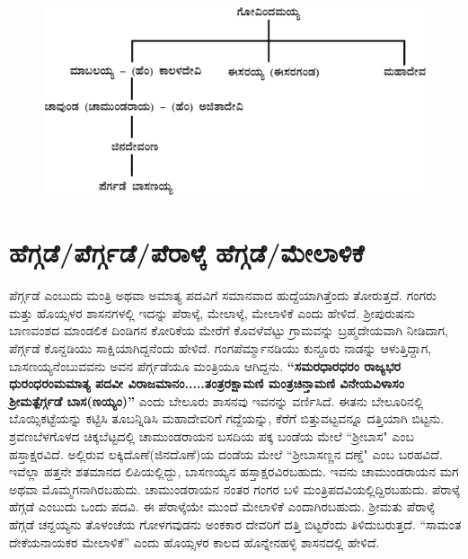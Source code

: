 \begin{figure}[H]
\includegraphics[scale=1.15]{images/chap3/chap3fig1.jpeg}
\end{figure}


\section*{ಹೆಗ್ಗಡೆ/ಪೆರ್ಗ್ಗಡೆ/ಪೆರಾಳ್ಕೆ ಹೆಗ್ಗಡೆ/ಮೇಲಾಳಿಕೆ}

ಪೆರ್ಗ್ಗಡೆ ಎಂಬುದು ಮಂತ್ರಿ ಅಥವಾ ಅಮಾತ್ಯ ಪದವಿಗೆ ಸಮಾನವಾದ ಹುದ್ದೆಯಾಗಿತ್ತೆಂದು ತೋರುತ್ತದೆ. ಗಂಗರು ಮತ್ತು ಹೊಯ್ಸಳರ ಶಾಸನಗಳಲ್ಲಿ ಇದನ್ನು ಪೆರಾಳ್ಕೆ, ಮೇಲಾಳ್ಕೆ, ಮೇಲಾಳಿಕೆ ಎಂದು ಹೇಳಿದೆ. ಶ‍್ರೀಪುರುಷನು ಬಾಣವಂಶದ ಮಾಂಡಲಿಕ ದಿಂಡಿಗನ ಕೋರಿಕೆಯ ಮೇರೆಗೆ ಕೊವಳೆವೆಟ್ಟು ಗ್ರಾಮವನ್ನು ಬ್ರಹ್ಮದೇಯವಾಗಿ ನೀಡಿದಾಗ, ಪೆರ್ಗ್ಗಡೆ ಕೊನ್ದಡಿಯು ಸಾಕ್ಷಿಯಾಗಿದ್ದನೆಂದು ಹೇಳಿದೆ. ಗಂಗಪೆರ್ಮ್ಮಾನಡಿಯು ಕುನ್ದೂರು ನಾಡನ್ನು ಆಳುತ್ತಿದ್ದಾಗ, ಬಾಸಣಯ್ಯನೆಂಬುವವನು ಅವನ ಪೆರ್ಗ್ಗಡೆಯೂ ಮಂತ್ರಿಯೂ ಆಗಿದ್ದನು.\textbf{ “ಸಮರಧಾರಧರಂ ರಾಜ್ಯಭರ ಧುರಂಧರಂಮಮಾತ್ಯ ಪದವೀ ವಿರಾಜಮಾನಂ.....ತಂತ್ರರಕ್ಷಾಮಣಿ ಮಂತ್ರಚಿನ್ತಾಮಣಿ ವಿನೇಯವಿಳಾಸಂ ಶ‍್ರೀಮತ್ಪೆರ್ಗ್ಗಡೆ ಬಾಸ(ಣಯ್ಯಂ)” }ಎಂದು ಬೇಲೂರು ಶಾಸನವು ಇವನನ್ನು ವರ್ಣಿಸಿದೆ. ಈತನು ಬೇಲೂರಿನಲ್ಲಿ ಬೊಯ್ಸಿಕಟ್ಟೆಯನ್ನು ಕಟ್ಟಿಸಿ ತೂಬನ್ನಿಡಿಸಿ ಮಹಾದೇವರಿಗೆ ಗದ್ದೆಯನ್ನು, ಕೆರೆಗೆ ಬಿತ್ತುವಟ್ಟವನ್ನೂ ದತ್ತಿಯಾಗಿ ಬಿಟ್ಟನು. ಶ್ರವಣಬೆಳಗೊಳದ ಚಿಕ್ಕಬೆಟ್ಟದಲ್ಲಿ ಚಾಮುಂಡರಾಯನ ಬಸದಿಯ ಪಕ್ಕ ಬಂಡೆಯ ಮೇಲೆ “ಶ‍್ರೀಬಾಸ" ಎಂಬ ಹಸ್ತಾಕ್ಷರವಿದೆ. ಅಲ್ಲಿರುವ ಲಕ್ಕಿದೊಣೆ(ಜಿನದೊಣೆ)ಯ ದಂಡೆಯ ಮೇಲೆ “ಶ‍್ರೀಬಾಸಣ್ಣನ ದಣ್ಡೆ" ಎಂಬ ಬರಹವಿದೆ. ಇವೆಲ್ಲಾ ಹತ್ತನೇ ಶತಮಾನದ ಲಿಪಿಯಲ್ಲಿದ್ದು, ಬಾಸಣಯ್ಯನ ಹಸ್ತಾಕ್ಷರವಿರಬಹುದು. ಇವನು ಚಾಮುಂಡರಾಯನ ಮಗ ಅಥವಾ ಮೊಮ್ಮಗನಾಗಿರಬಹುದು. ಚಾಮುಂಡರಾಯನ ನಂತರ ಗಂಗರ ಬಳಿ ಮಂತ್ರಿಪದವಿ\-ಯಲ್ಲಿದ್ದಿರಬಹುದು. ಪೆರಾಳ್ಕೆ ಹೆಗ್ಗಡೆ ಎಂಬುದು ಒಂದು ಪದವಿ. ಈ ಪೆರಾಳ್ಕೆಯೇ ಮುಂದೆ ಮೇಲಾಳಿಕೆ ಎಂದಾಗಿರಬಹುದು. ಶ‍್ರೀಮತು ಪೆರಾಳ್ಕೆ ಹೆಗ್ಗಡೆ ಚನ್ದಯ್ಯನು ತೊಳಂಚೆಯ ಗೋಳಗವುಡನು ಅಂಕಕಾರ ದೇವರಿಗೆ ದತ್ತಿ ಬಿಟ್ಟರೆಂದು ತಿಳಿದುಬರುತ್ತದೆ. “ಸಾಮಂತ ದೇಕೆಯನಾಯಕರ ಮೇಲಾಳಿಕೆ” ಎಂದು ಹೊಯ್ಸಳರ ಕಾಲದ ಹೊನ್ನೇನಹಳ್ಳಿ ಶಾಸನದಲ್ಲಿ ಹೇಳಿದೆ.

